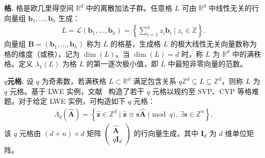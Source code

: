 \documentclass[12pt,a4paper]{article}
\numberwithin{equation}{section}
\begin{document}
\textbf{格.}
格是欧几里得空间 $\mathbb{R}^d$ 中的离散加法子群。任意格 $L$ 可由 $\mathbb{R}^d$ 中线性无关的行向量组 $\mathbf{b}_1,\ldots, \mathbf{b}_h$ 生成：
\begin{align}
    L = \mathcal{L}(\mathbf{b}_1,\ldots, \mathbf{b}_h) = \left\{ \sum_{i=1}^h z_i \mathbf{b}_i \mid z_i \in \mathbb{Z} \right\}.
\end{align}
向量组 $\mathbf{B}=(\mathbf{b}_1,\ldots, \mathbf{b}_h)$ 称为 $L$ 的格基，生成格 $L$ 的极大线性无关向量数称为格的维度（或秩），记为 $\dim(L)$。当 $\dim(L) = d$ 时，称 $L$ 为 $\mathbb{R}^d$ 中的满秩格。定义 $\lambda_1(L)$ 为格 $L$ 的第一逐次极小值，即 $L$ 中最短非零向量的范数。

\textbf{$q$元格.}
设 $q$ 为奇素数，若满秩格 $L \subset \mathbb{R}^d$ 满足包含关系 $q \mathbb{Z}^d \subseteq L \subseteq \mathbb{Z}^d$，则称 $L$ 为 $q$ 元格。基于 LWE 实例，文献~\cite{micciancioLatticebasedCryptography2009} 构造了若干 $q$ 元格以规约至 SVP、CVP 等格难题。对于给定 LWE 实例，可构造如下 $q$ 元格：
\begin{align}
    \Lambda_q(\mathbf{\hat{A}}) = \left\{ \mathbf{\hat{z}} \in \mathbb{Z}^d \mid \mathbf{\hat{z}} \equiv \mathbf{s}\mathbf{\hat{A}} \pmod{q},\ \exists \mathbf{s} \in \mathbb{Z}^n \right\}.
\end{align}
该 $q$ 元格由 $(d+n)\times d$ 矩阵 $\begin{pmatrix} \mathbf{\hat{A}} \\ q\mathbf{I}_d \end{pmatrix}$ 的行向量生成，其中 $\mathbf{I}_d$ 为 $d$ 维单位矩阵。






\end{document}

